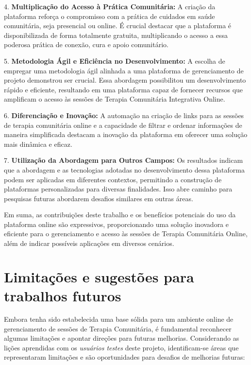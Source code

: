     4. \textbf{Multiplicação do Acesso à Prática Comunitária:}
       A criação da plataforma reforça o compromisso com a prática de cuidados em saúde comunitária, seja presencial ou online. É crucial destacar que a plataforma é disponibilizada de forma totalmente gratuita, multiplicando o acesso a essa poderosa prática de conexão, cura e apoio comunitário.
    
    5. \textbf{Metodologia Ágil e Eficiência no Desenvolvimento:}
       A escolha de empregar uma metodologia ágil alinhada a uma plataforma de gerenciamento de projeto demonstrou ser crucial. Essa abordagem possibilitou um desenvolvimento rápido e eficiente, resultando em uma plataforma capaz de fornecer recursos que amplificam o acesso às sessões de Terapia Comunitária Integrativa Online.
    
    6. \textbf{Diferenciação e Inovação:}
       A automação na criação de links para as sessões de terapia comunitária online e a capacidade de filtrar e ordenar informações de maneira simplificada destacam a inovação da plataforma em oferecer uma solução mais dinâmica e eficaz.
    
    7. \textbf{Utilização da Abordagem para Outros Campos:}
    Os resultados indicam que a abordagem e as tecnologias adotadas no desenvolvimento dessa plataforma podem ser aplicadas em diferentes contextos, permitindo a construção de plataformas personalizadas para diversas finalidades. Isso abre caminho para pesquisas futuras abordarem desafios similares em outras áreas.
    
    Em suma, as contribuições deste trabalho e os benefícios potenciais do uso da plataforma online são expressivos, proporcionando uma solução inovadora e eficiente para o gerenciamento e acesso às sessões de Terapia Comunitária Online, além de indicar possíveis aplicações em diversos cenários.

\section{Limitações e sugestões para trabalhos futuros}
    Embora tenha sido estabelecida uma base sólida para um ambiente online de gerenciamento de sessões de Terapia Comunitária, é fundamental reconhecer algumas limitações e apontar direções para futuras melhorias. Considerando as lições aprendidas com os \textit{usuários testes} deste projeto, identificam-se áreas que representaram limitações e são oportunidades para desafios de melhorias futuras:

